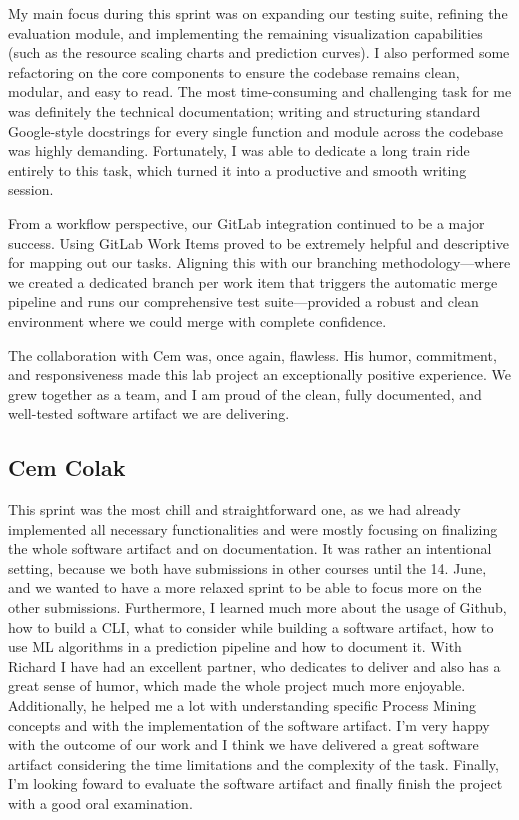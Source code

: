\documentclass[12pt,a4paper]{article}
\begin{document}
My main focus during this sprint was on expanding our testing suite, refining the evaluation module, and implementing the remaining visualization capabilities (such as the resource scaling charts and prediction curves). I also performed some refactoring on the core components to ensure the codebase remains clean, modular, and easy to read. The most time-consuming and challenging task for me was definitely the technical documentation; writing and structuring standard Google-style docstrings for every single function and module across the codebase was highly demanding. Fortunately, I was able to dedicate a long train ride entirely to this task, which turned it into a productive and smooth writing session.

From a workflow perspective, our GitLab integration continued to be a major success. Using GitLab Work Items proved to be extremely helpful and descriptive for mapping out our tasks. Aligning this with our branching methodology—where we created a dedicated branch per work item that triggers the automatic merge pipeline and runs our comprehensive test suite—provided a robust and clean environment where we could merge with complete confidence. 

The collaboration with Cem was, once again, flawless. His humor, commitment, and responsiveness made this lab project an exceptionally positive experience. We grew together as a team, and I am proud of the clean, fully documented, and well-tested software artifact we are delivering.

\subsection{Cem Colak}
This sprint was the most chill and straightforward one, as we had already implemented all necessary functionalities and were mostly focusing on finalizing the whole software artifact and on documentation. It was rather an intentional setting, because we both have submissions in other courses until the 14. June, and we wanted to have a more relaxed sprint to be able to focus more on the other submissions. Furthermore, I learned much more about the usage of Github, how to build a CLI, what to consider while building a software artifact, how to use ML algorithms in a prediction pipeline and how to document it. With Richard I have had an excellent partner, who dedicates to deliver and also has a great sense of humor, which made the whole project much more enjoyable. Additionally, he helped me a lot with understanding specific Process Mining concepts and with the implementation of the software artifact. I'm very happy with the outcome of our work and I think we have delivered a great software artifact considering the time limitations and the complexity of the task. Finally, I'm looking foward to evaluate the software artifact and finally finish the project with a good oral examination.
\end{document}
